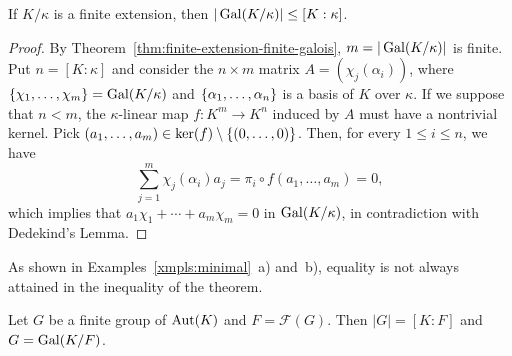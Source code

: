 \begin{thm}\label{thm:gal-order-bound}
    If\/ $K/\kappa$ is a finite extension, then\/ $|\operatorname{Gal}(K/\kappa)|\le [K:\kappa]$.
\end{thm}

\begin{proof}
    By Theorem~\ref{thm:finite-extension-finite-galois}, $m=|\operatorname{Gal}(K/\kappa)|$ is finite. Put $n=[K:\kappa]$ and consider the $n\times m$ matrix $A=(\chi_j(\alpha_i))$, where $\{\chi_1,\dots,\chi_m\}=\operatorname{Gal}(K/\kappa)$ and $\{\alpha_1,\dots,\alpha_n\}$ is a basis of $K$ over $\kappa$. If we suppose that $n<m$, the $\kappa$-linear map $f\colon K^m\to K^n$ induced by $A$ must have a nontrivial kernel. Pick $(a_1,\dots, a_m)\in\ker(f)\setminus\{(0,\dots,0)\}$. Then, for every $1\le i\le n$, we have
    $$
        \sum_{j=1}^m\chi_j(\alpha_i)a_j=\pi_i\circ f(a_1,\dots,a_m)=0,
    $$
    which implies that $a_1\chi_1+\cdots+a_m\chi_m=0$ in $\operatorname{Gal}(K/\kappa)$, in contradiction with Dedekind's Lemma.
\end{proof}

\begin{rem}
    As shown in Examples~\ref{xmpls:minimal}~a) and~b), equality is not always attained in the inequality of the theorem. 
\end{rem}

\begin{cor}\label{cor:galois-group=dim}
    Let\/ $G$ be a finite group of\/ ${\rm Aut}(K)$ and\/ $F = \mathcal F(G)$. Then\/ $|G| = [K:F]$ and\/ $G=\operatorname{Gal}(K/F)$.
\end{cor}

